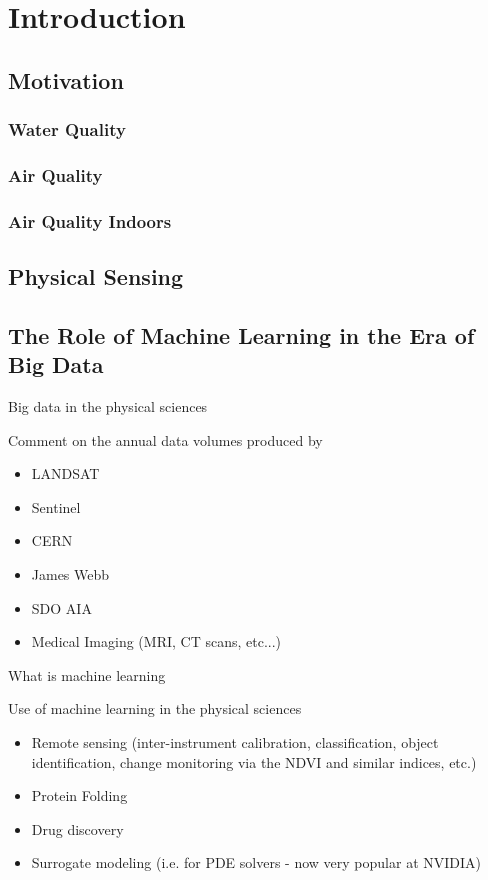 \chapter{Introduction}\label{ch:intro}

\section{Motivation}

\subsection{Water Quality}
\subsection{Air Quality}
\subsection{Air Quality Indoors}

\section{Physical Sensing}

\section{The Role of Machine Learning in the Era of Big Data}

Big data in the physical sciences

Comment on the annual data volumes produced by
\begin{itemize}
  \item LANDSAT
  \item Sentinel
  \item CERN
  \item James Webb
  \item SDO AIA
  \item Medical Imaging (MRI, CT scans, etc...)
\end{itemize}

What is machine learning

Use of machine learning in the physical sciences

\begin{itemize}
  \item Remote sensing (inter-instrument calibration, classification, object identification, change monitoring via the NDVI and similar indices, etc.)
  \item Protein Folding
  \item Drug discovery
  \item Surrogate modeling (i.e. for PDE solvers - now very popular at NVIDIA)
\end{itemize}




